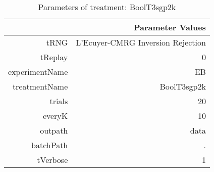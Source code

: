 \begin{table}[ht]
\centering
\begin{tabular}{rr}
  \hline
 & Parameter Values \\ 
  \hline
tRNG & L'Ecuyer-CMRG Inversion Rejection \\ 
  tReplay & 0 \\ 
  experimentName & EB \\ 
  treatmentName & BoolT3sgp2k \\ 
  trials & 20 \\ 
  everyK & 10 \\ 
  outpath & data \\ 
  batchPath & . \\ 
  tVerbose & 1 \\ 
   \hline
\end{tabular}
\caption{ Parameters of treatment: BoolT3sgp2k 
} 
\end{table}
